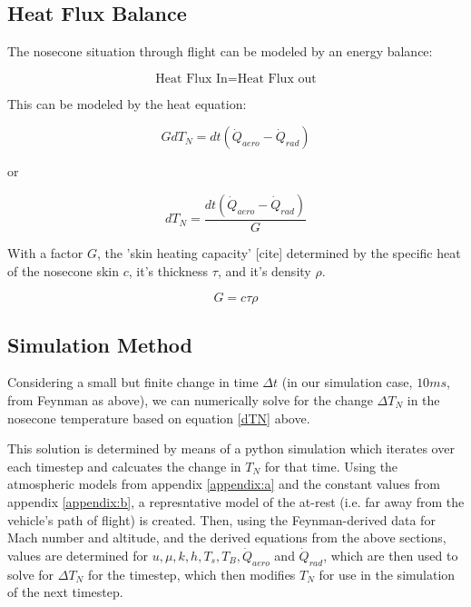 \documentclass[twocolumn]{article}
\begin{document}
        \subsection{Heat Flux Balance}
            The nosecone situation through flight can be modeled by an energy 
            balance:

            \[\textrm{Heat Flux In} = \textrm{Heat Flux out}\]

            This can be modeled by the heat equation:

            \[G dT_N = dt(\dot{Q}_{aero}-\dot{Q}_{rad})\]

            or 

            \begin{equation}
                \label{dTN}
                dT_N = \frac{dt(\dot{Q}_{aero}-\dot{Q}_{rad})}{G}
            \end{equation}

            With a factor $G$, the 'skin heating capacity' [cite] %
            determined by the specific heat of the nosecone skin $c$, it's 
            thickness $\tau$, and it's density $\rho$.

            \[G=c\tau\rho\]

        \subsection{Simulation Method}

            Considering a small but finite change in time $\Delta t$ (in our 
            simulation case, $10ms$, from Feynman as above), we can
            numerically solve for the change $\Delta T_N$ in the nosecone
            temperature based on equation \ref{dTN} above. 

            This solution is determined by means of a python simulation which
            iterates over each timestep and calcuates the change in $T_N$
            for that time. Using the atmospheric models from appendix 
            \ref{appendix:a} and the constant values from appendix 
            \ref{appendix:b}, a represntative model of the at-rest (i.e. far
            away from the vehicle's path of flight) is created. Then, using the 
            Feynman-derived data for Mach number and altitude, and the derived
            equations from the above sections, values are determined for $u,
            \mu, k, h, T_s, T_B, \dot{Q}_{aero}$ and $\dot{Q}_{rad}$, which are
            then used to solve for $\Delta T_N$ for the timestep, which then
            modifies $T_N$ for use in the simulation of the next timestep.
\end{document}
